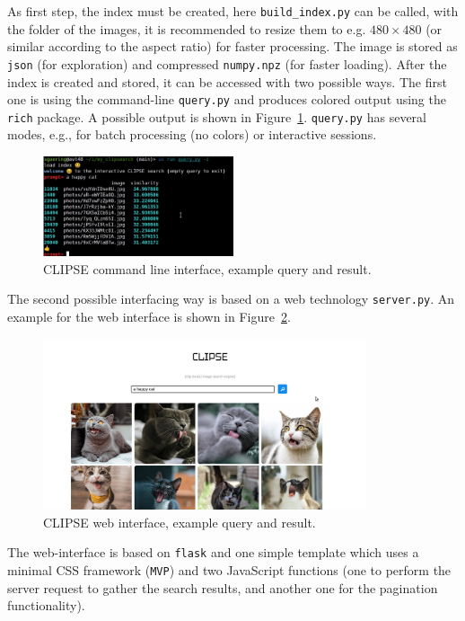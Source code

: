 \documentclass{article}
\begin{document}
As first step, the index must be created, here \lstinline[language={bash}]{build_index.py} can be called, with the folder of the images, it is recommended to resize them to e.g. $480\times480$ (or similar according to the aspect ratio) for faster processing.
The image is stored as \texttt{json} (for exploration) and compressed \lstinline[language={python}]{numpy.npz} (for faster loading).
After the index is created and stored, it can be accessed with two possible ways.
The first one is using the command-line \lstinline[language={bash}]{query.py} and produces colored output using the \texttt{rich} package.
A possible output is shown in Figure~\ref{fig:cli}.
\lstinline[language={bash}]{query.py} has several modes, e.g., for batch processing (no colors) or interactive sessions.

\begin{figure}
\centering
\includegraphics[width=0.5\textwidth]{CLI.jpg}
\caption{CLIPSE command line interface, example query and result.}
\label{fig:cli}
\end{figure}

The second possible interfacing way is based on a web technology \lstinline[language={bash}]{server.py}.
An example for the web interface is shown in Figure~\ref{fig:web}.

\begin{figure}
\centering
\includegraphics[width=0.85\textwidth]{WEB.jpg}
\caption{CLIPSE web interface, example query and result.}
\label{fig:web}
\end{figure}

The web-interface is based on \texttt{flask} and one simple template which uses a minimal CSS framework (\texttt{MVP}) and two JavaScript functions (one to perform the server request to gather the search results, and another one for the pagination functionality).
\end{document}
